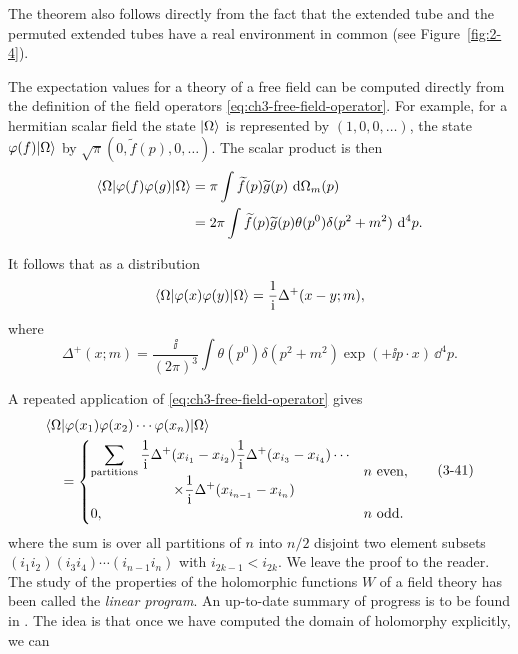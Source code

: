 The theorem also follows directly from the fact that the extended tube and
the permuted extended tubes have a real environment in common (see
Figure~\ref{fig:2-4}).

The expectation values for a theory of a free field can be computed directly
from the definition of the field operators \eqref{eq:ch3-free-field-operator}. For example, for a
hermitian scalar field the state $\lvert \Omega\rangle$ is represented by
$(1,0,0,\ldots)$, the state $\varphi(f)\lvert \Omega\rangle$ by
$\sqrt{\pi}(0,\widetilde f(p),0,\ldots)$. The scalar product is then
\begin{align*}
 \langle \Omega\rvert\varphi(f)\varphi(g)\lvert \Omega\rangle
 &=\pi\int\widetilde f(p)\widetilde g(p)\,\mathop{}\!\mathrm{d}\Omega_m(p)\\
 &=2\pi\int\widetilde f(p)\widetilde g(p)\theta(p^0)
 \delta(p^2+m^2)\,\mathop{}\!\mathrm{d}^4p.
\end{align*}

It follows that as a distribution
\begin{equation*}
 \langle \Omega\rvert\varphi(x)\varphi(y)\lvert \Omega\rangle
 =\frac{1}{\mathrm{i}}\Delta^+(x-y;m),
\end{equation*}
where
\begin{equation*}
 \Delta^+(x;m)=\frac{\ii}{(2\pi)^3}
 \int\theta(p^0)\delta(p^2+m^2)\exp(+\ii p\!\cdot x)\,\dd^4p.
\end{equation*}

A repeated application of \eqref{eq:ch3-free-field-operator} gives
\begin{equation}
\begin{aligned}
 &\langle \Omega\rvert\varphi(x_1)\varphi(x_2)\cdots\varphi(x_n)\lvert \Omega\rangle\\
 &\quad=
 \begin{cases}
 \begin{gathered}
  \displaystyle\sum_{\text{partitions}}
  \frac{1}{\mathrm{i}}\Delta^+(x_{i_1}-x_{i_2})
  \frac{1}{\mathrm{i}}\Delta^+(x_{i_3}-x_{i_4})\cdots\\[-2pt]
  \displaystyle\qquad\times\frac{1}{\mathrm{i}}\Delta^+(x_{i_{n-1}}-x_{i_n})
 \end{gathered}
 &n\ \text{even},\\[6pt]
 0,&n\ \text{odd}.
 \end{cases}
\end{aligned}
\tag{3-41}\label{eq:pct-3-41}
\end{equation}
where the sum is over all partitions of $n$ into $n/2$ disjoint two element
subsets $(i_1i_2)\allowbreak(i_3i_4)\allowbreak\cdots\allowbreak
(i_{n-1}i_n)$ with $i_{2k-1}<i_{2k}$. We leave
the proof to the reader. The study of the properties of the holomorphic
functions $W$ of a field theory has been called the \emph{linear program}.
An up-to-date summary of progress is to be found in \cite{pct-ch3-12}. The idea is
that once we have computed the domain of holomorphy explicitly, we can
